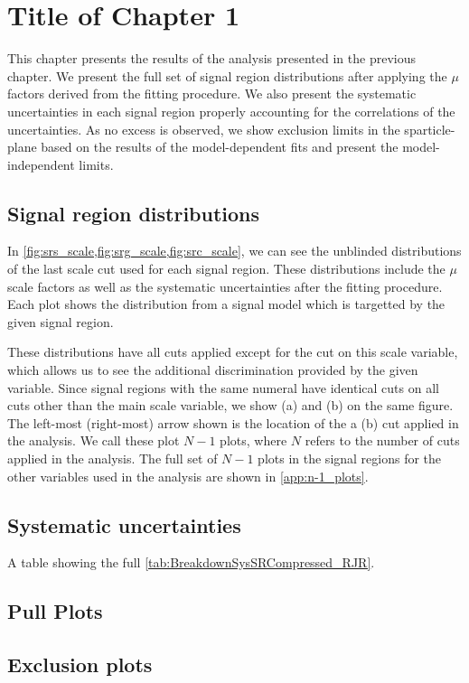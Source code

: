 

\chapter[Results][Top of Page Title]{Title of Chapter 1}

This chapter presents the results of the analysis presented in the previous chapter.
We present the full set of signal region distributions after applying the $\mu$ factors derived from the fitting procedure.
We also present the systematic uncertainties in each signal region properly accounting for the correlations of the uncertainties.
As no excess is observed, we show exclusion limits in the sparticle-\lsp plane based on the results of the model-dependent fits and present the model-independent limits.

\section{Signal region distributions}

In \ref{fig:srs_scale,fig:srg_scale,fig:src_scale}, we can see the unblinded distributions of the last scale cut used for each signal region.
These distributions include the $\mu$ scale factors as well as the systematic uncertainties after the fitting procedure.
Each plot shows the distribution from a signal model which is targetted by the given signal region.

These distributions have all cuts applied except for the cut on this scale variable, which allows us to see the additional discrimination provided by the given variable.
Since signal regions with the same numeral have identical cuts on all cuts other than the main scale variable, we show (a) and (b) on the same figure.
The left-most (right-most) arrow shown is the location of the a (b) cut applied in the analysis.
We call these plot \textit{$N-1$} plots, where $N$ refers to the number of cuts applied in the analysis.
The full set of $N-1$ plots in the signal regions for the other variables used in the analysis are shown in \ref{app:n-1_plots}.



\section{Systematic uncertainties}

A table showing the full \ref{tab:BreakdownSysSRCompressed_RJR}.



\section{Pull Plots}

\section{Exclusion plots}
